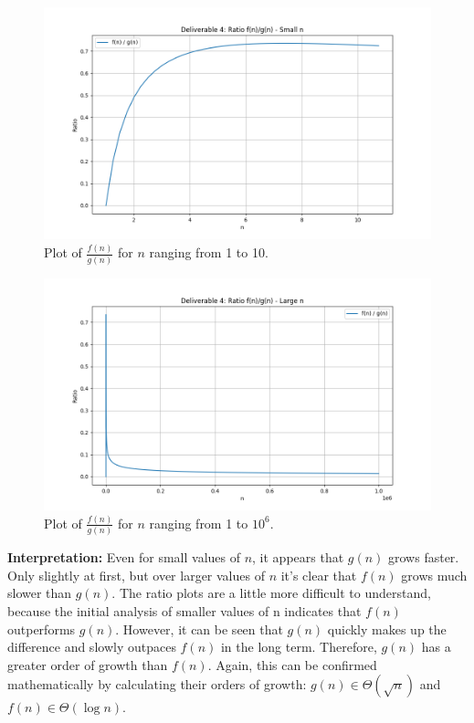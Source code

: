 \documentclass{article}
\begin{document}
\begin{figure}[H]
    \centering
    \includegraphics[width=\textwidth]{plot_deliverable4_ratio_smalln.png}
    \caption{Plot of $\frac{f(n)}{g(n)}$ for $n$ ranging from 1 to 10.}
    \label{fig:ratio_fn3_gn3_2_10}
\end{figure}

\begin{figure}[H]
    \centering
    \includegraphics[width=\textwidth]{plot_deliverable4_ratio_largen.png}
    \caption{Plot of $\frac{f(n)}{g(n)}$ for $n$ ranging from 1 to $10^6$.}
    \label{fig:ratio_fn3_gn3_2_10e6}
\end{figure}

\textbf{Interpretation:} Even for small values of $n$, it appears that $g(n)$ grows faster. Only slightly at first, but over larger values of $n$ it's clear that $f(n)$ grows much slower than $g(n)$. The ratio plots are a little more difficult to understand, because the initial analysis of smaller values of n indicates that $f(n)$ outperforms $g(n)$. However, it can be seen that $g(n)$ quickly makes up the difference and slowly outpaces $f(n)$ in the long term. Therefore, $g(n)$ has a greater order of growth than $f(n)$. Again, this can be confirmed mathematically by calculating their orders of growth: $g(n) \in \Theta(\sqrt{n})$ and $f(n) \in \Theta(\log n)$.
\end{document}
